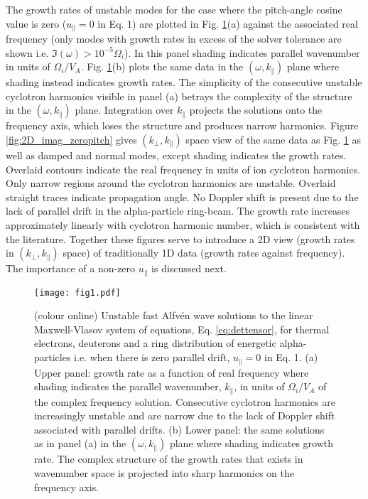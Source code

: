 \documentclass[12pt]{iopart}
\begin{document}
The growth rates of unstable modes for the case where the pitch-angle cosine
value is zero ($u_\parallel = 0$ in Eq. 1) are plotted in Fig.
\ref{fig:2D_F12_zeropitch}(a) against the associated real frequency (only modes
with growth rates in excess of the solver tolerance are shown i.e. $\Im(\omega)
> 10^{-5} \Omega_i$). In this panel shading indicates parallel wavenumber in
units of $\Omega_i/V_A$. Fig. \ref{fig:2D_F12_zeropitch}(b) plots the same data
in the $(\omega,k_\parallel)$ plane where shading instead indicates growth
rates. The simplicity of the consecutive unstable cyclotron harmonics visible in
panel (a) betrays the complexity of the structure in the $(\omega,k_\parallel)$
plane. Integration over $k_\parallel$ projects the solutions onto the frequency
axis, which loses the structure and produces narrow harmonics. Figure
\ref{fig:2D_imag_zeropitch} gives $(k_\perp, k_\parallel)$ space view of the
same data as Fig. \ref{fig:2D_F12_zeropitch} as well as damped and
normal modes, except shading indicates the growth rates. Overlaid
contours indicate the real frequency in units of ion cyclotron harmonics. Only
narrow regions around the cyclotron harmonics are unstable. Overlaid straight
traces indicate propagation angle. No Doppler shift is present due to the lack
of parallel drift in the alpha-particle ring-beam. The growth rate increases
approximately linearly with cyclotron harmonic number, which is consistent with
the literature\cite{Dendy1994}. Together these figures serve to introduce a 2D
view (growth rates in $(k_\perp, k_\parallel)$ space) of traditionally 1D data
(growth rates against frequency). The importance of a non-zero $u_\parallel$ is
discussed next.

\begin{figure}[ht!]
    \raggedleft
\texttt{[image: fig1.pdf]}
    \caption{(colour online) Unstable fast Alfv{\'e}n wave solutions to the
    linear Maxwell-Vlasov system of equations, Eq. \ref{eq:dettensor}, for
    thermal electrons, deuterons and a ring distribution of energetic
    alpha-particles i.e. when there is zero parallel drift, $u_\parallel=0$ in
    Eq. 1. (a) Upper panel: growth rate as a function of real frequency where shading
    indicates the parallel wavenumber, $k_\parallel$, in units of $\Omega_i/V_A$
    of the complex frequency solution. Consecutive cyclotron harmonics are
    increasingly unstable and are narrow due to the lack of Doppler shift 
    associated with parallel drifts. (b) Lower panel: the same solutions
    as in panel (a) in the $(\omega,k_\parallel)$ plane where shading indicates 
    growth rate. The complex structure of the growth rates that exists in
    wavenumber space is projected into sharp harmonics on the frequency axis.}
    \label{fig:2D_F12_zeropitch}
\end{figure}
\end{document}

